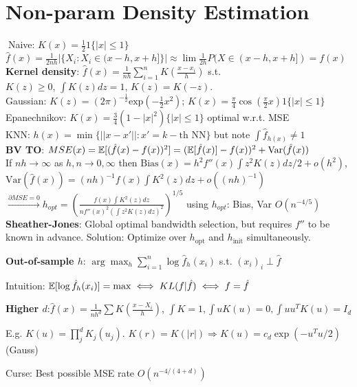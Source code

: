 \section*{Non-param Density Estimation}
$\;$Naive: $K(x)=\frac{1}{2}1\{|x|\leq1\}$
$\hat{f}(x)=\frac{1}{2nh}|\{X_i:X_i\in (x-h,x+h]\}|\approx \lim\frac{1}{2h}P(X\in (x-h,x+h])=f(x)$
\\
\textbf{Kernel density}: $\hat{f}(x) = \frac{1}{nh} \sum_{i=1}^n K\left(\frac{x-x_i}{h}\right)$ s.t.\\
$K(z) \geq 0$, $\int K(z) dz = 1$, $K(z) = K(-z)$.
\\
Gaussian: $K(z) = (2\pi)^{-\frac{1}{2}} \text{exp}(-\frac{1}{2}x^2)$; $K(x)=\frac{\pi}{4}\cos(\frac{\pi}{2}x)1\{|x|\leq1\}$\\
Epanechnikov: $K(x)=\frac{3}{4}(1-|x|^2)\{|x|\leq1\}$ optimal w.r.t. MSE\\
KNN: $h(x)=\min \{||x-x'||:x'=k-\text{th NN}\}$ but note $\int \hat{f}_{h(x)}\neq 1$\\
\textbf{BV TO}: $MSE(x)=\mathbb{E}[(\hat{f}(x)-f(x))^2]=(\mathbb{E}[\hat{f}(x)]-f(x))^2+\text{Var}(\hat{f}(x))$\\
If $nh\rightarrow\infty$ as $h,n\rightarrow0,\infty$ then $\text{Bias}(x)=h^2f''(x)\int z^2K(z)dz/2+o(h^2)$, $\text{Var}(\hat{f}(x))=(nh)^{-1}f(x)\int K^2(z)dz+o((nh)^{-1})$ $\stackrel{\partial MSE=0}{\rightarrow} h_{opt}=(\frac{f(x)\int K^2(z)dz}{nf''(x)^2(\int z^2K(z)dz)^2})^{1/5}$ using $h_{opt}$: Bias, Var $O(n^{-4/5})$
\textbf{Sheather-Jones}: Global optimal bandwidth selection, but requires $f''$ to be known in advance. Solution: Optimize over $h_{\text{opt}}$ and $h_{\text{init}}$ simultaneously.

\textbf{Out-of-sample $h$}: $\arg\max_h\sum_{i=1}^n \log \hat{f}_h(x_i)$ s.t. $(x_i)_i\perp\hat{f}$

Intuition: $\mathbb{E}[\log \hat{f}_h(x_i)]=\max\iff KL(f|\hat{f}) \iff f=\hat{f}$

\textbf{Higher $d$}:$\hat{f}(x)=\frac{1}{nh^d}\sum K(\frac{x-X_i}{h})$, $\int K =1, \int uK(u)=0, \int uu^TK(u)=I_d$

E.g. $K(u)=\prod_j^d K_j(u_j)$. $K(r)=K(|r|)\Rightarrow K(u)=c_d\exp(-u^Tu/2)$ (Gauss)

Curse: Best possible MSE rate $O(n^{-4/(4+d)})$

